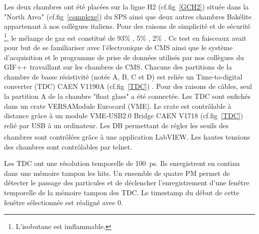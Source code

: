 Les deux chambres ont été placées sur la ligne H2 (cf.fig~\ref{GCH2}) située dans la "North Area" (cf.fig~\ref{complexe}) du SPS ainsi que deux autres chambres Bakélite appartenant à nos collègues italiens. Pour des raisons de simplicité et de sécurité \footnote{L'isobutane est imflammable.}, le mélange de gaz est constitué de 93\% , 5\% , 2\% . Ce test en faisceaux avait pour but de se familiariser avec l'électronique de CMS ainsi que le système d'acquisition et le programme de prise de données utilisés par nos collègues du GIF++ travaillant sur les chambres de CMS. 
Chacune des partitions de la chambre de basse résistivité (notée A, B, C et D) est reliée un Time-to-digital converter (TDC) CAEN V1190A (cf.fig~\ref{TDC}) \cite{TDC}. Pour des raisons de câbles, seul la partition A de la chambre "float glass" a été connectée. Les TDC sont enfichés dans un crate VERSAModule Eurocard (VME). Le crate est contrôlable à distance grâce à un module VME-USB2.0 Bridge CAEN V1718 (cf.fig~\ref{TDC}) \cite{VME} relié par USB à un ordinateur. Les DB permettant de régler les seuils des chambres sont contrôlées grâce à une application LabVIEW\textsuperscript{\textregistered}. Les hautes tensions des chambres sont contrôlables par telnet. 

Les TDC ont une résolution temporelle de \SI{100}{\pico\second}. Ils enregistrent en continu dans une mémoire tampon les hits. Un ensemble de quatre PM permet de détecter le passage des particules et de déclencher l'enregistrement d'une fenêtre temporelle de la mémoire tampon des TDC. Le timestamp du début de cette fenêtre sélectionnée est réaligné avec $0$.

